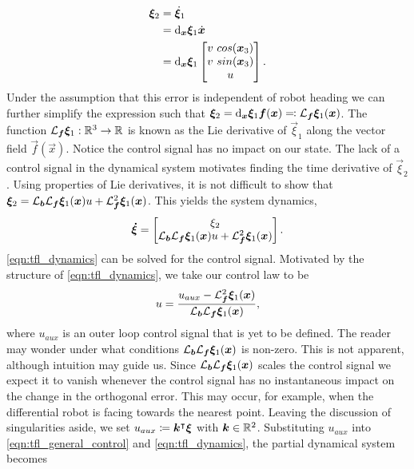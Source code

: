 \begin{align*}
    \bm{\xi}_2     &=  \dot{\bm{\xi}}_1\\
                    &=  \mathop{}\!\mathrm{d}_{\bm{x}}\bm{\xi}_1 \dot{\bm{x}}\\
                    &=  \mathop{}\!\mathrm{d}_{\bm{x}}\bm{\xi}_1
                        \begin{bmatrix}
                            v~cos(\bm{x}_3)\\
                            v~sin(\bm{x}_3)\\
                            u
                        \end{bmatrix}.
\end{align*}
Under the assumption that this error is independent of robot heading we can further simplify the expression such that $\bm{\xi}_2=\mathop{}\!\mathrm{d}_{\bm{x}}\bm{\xi}_1 \bm{f}(\bm{x}) \eqqcolon \mathcal{L}_{\bm{f}}\bm{\xi}_1(\bm{x})$. The function $\mathcal{L}_{\bm{f}}\bm{\xi}_1 : \mathbb{R}^3\to\mathbb{R}$ is known as the Lie derivative of $\vec{\xi}_1$ along the vector field $\vec{f}(\vec{x})$. Notice the control signal has no impact on our state. The lack of a control signal in the dynamical system motivates finding the time derivative of $\vec{\xi}_2$. Using properties of Lie derivatives, it is not difficult to show that $\bm{\xi}_2=\mathcal{L}_{\bm{b}}\mathcal{L}_{\bm{f}}\bm{\xi}_1(\bm{x}) u + \mathcal{L}_{\bm{f}}^2 \bm{\xi}_1(\bm{x})$. This yields the system dynamics,
\begin{equation}
    \bm{\dot{\xi}}
    =
    \begin{bmatrix}
        \xi_2 \\
        \mathcal{L}_{\bm{b}}\mathcal{L}_{\bm{f}}\bm{\xi}_1(\bm{x}) u + \mathcal{L}_{\bm{f}}^2 \bm{\xi}_1(\bm{x})
    \end{bmatrix}.
    \label{eqn:tfl_dynamics}
\end{equation}
\eqref{eqn:tfl_dynamics} can be solved for the control signal. Motivated by the structure of \eqref{eqn:tfl_dynamics}, we take our control law to be
\begin{equation}
    u = \frac{ u_{aux} - \mathcal{L}_{\bm{f}}^2 \bm{\xi}_1(\bm{x}) }{ \mathcal{L}_{\bm{b}}\mathcal{L}_{\bm{f}}\bm{\xi}_1(\bm{x}) },
    \label{eqn:tfl_general_control}
\end{equation}
where $u_{aux}$ is an outer loop control signal that is yet to be defined. The reader may wonder under what conditions $\mathcal{L}_{\bm{b}}\mathcal{L}_{\bm{f}}\bm{\xi}_1(\bm{x})$ is non-zero. This is not apparent, although intuition may guide us. Since $\mathcal{L}_{\bm{b}}\mathcal{L}_{\bm{f}}\bm{\xi}_1(\bm{x})$ scales the control signal we expect it to vanish whenever the control signal has no instantaneous impact on the change in the orthogonal error. This may occur, for example, when the differential robot is facing towards the nearest point. Leaving the discussion of singularities aside, we set $u_{aux} \coloneqq {\bm{k}}^{\intercal}\bm{\xi}$ with $\bm{k}\in\mathbb{R}^2$. Substituting $u_{aux}$ into \eqref{eqn:tfl_general_control} and \eqref{eqn:tfl_dynamics}, the partial dynamical system becomes
